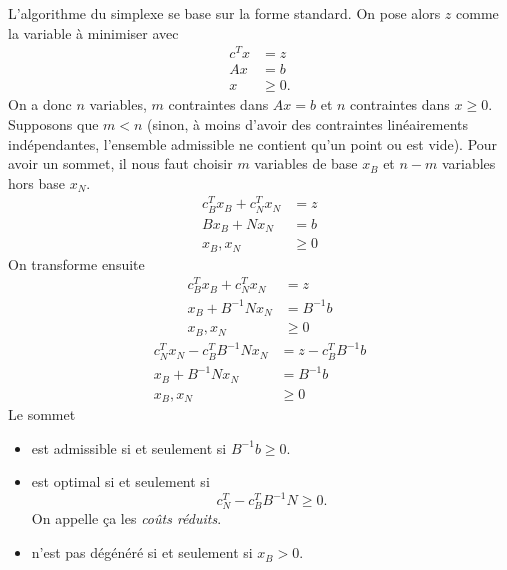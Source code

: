 L'algorithme du simplexe se base sur la forme standard.
On pose alors $z$ comme la variable à minimiser avec
\begin{align*}
  c^T x & = z\\
  Ax & = b\\
  x & \geq 0.
\end{align*}
On a donc $n$ variables,
$m$ contraintes dans $Ax = b$ et
$n$ contraintes dans $x \geq 0$.
Supposons que $m < n$ (sinon, à moins d'avoir des contraintes linéairements
indépendantes, l'ensemble admissible ne contient qu'un point ou est vide).
Pour avoir un sommet, il nous faut choisir
$m$ variables de base $x_B$ et $n-m$ variables hors base $x_N$.
\begin{align*}
  c_B^Tx_B + c_N^Tx_N & = z\\
  Bx_B + Nx_N & = b\\
  x_B,x_N & \geq 0
\end{align*}
On transforme ensuite
\begin{align*}
  c_B^Tx_B + c_N^Tx_N & = z\\
  x_B + B^{-1}Nx_N & = B^{-1}b\\
  x_B, x_N & \geq 0
\end{align*}
\begin{align*}
  c_N^Tx_N-c_B^TB^{-1}Nx_N & = z - c_B^TB^{-1}b\\
  x_B + B^{-1}Nx_N & = B^{-1}b\\
  x_B, x_N & \geq 0
\end{align*}
Le sommet
\begin{itemize}
  \item est admissible si et seulement si $B^{-1}b \geq 0$.
  \item est optimal si et seulement si
    \[ c_N^T - c_B^TB^{-1}N \geq 0. \]
    On appelle ça les \emph{coûts réduits}.
  \item n'est pas dégénéré si et seulement si $x_B > 0$.
\end{itemize}
